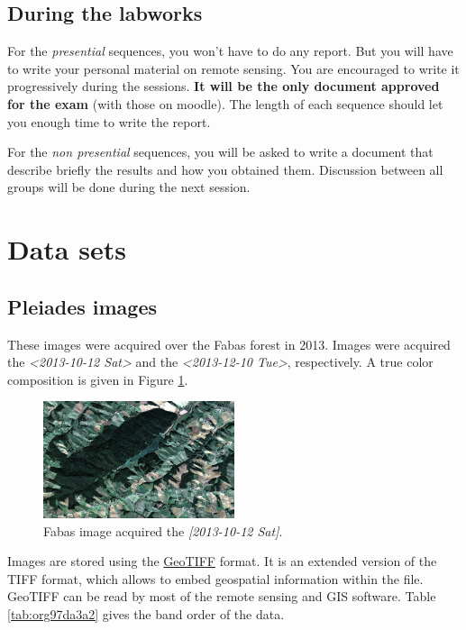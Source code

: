\documentclass[a4paper,11pt,DIV=18]{scrartcl}
\begin{document}
\subsection{During the labworks}
\label{sec:org47efc90}
For the \emph{presential} sequences, you won't have to do any report. But you
will have to  write your personal material on remote  sensing. You are
encouraged to write it progressively  during the sessions.  \textbf{It will be
the only  document approved for the  exam} (with those on  moodle). The
length  of each  sequence  should let  you enough  time  to write  the
report.

For  the \emph{non  presential}  sequences,  you will  be  asked  to write  a
document  that  describe briefly  the  results  and how  you  obtained
them.  Discussion between  all groups  will  be done  during the  next
session.
\section{Data sets}
\label{sec:orgcfb8282}
\subsection{Pleiades images}
\label{sec:org607d3bd}
These images were acquired over the  Fabas forest in 2013. Images were
acquired   the   \textit{<2013-10-12 Sat>    }    and   the   \textit{<2013-12-10 Tue>},
respectively. A true color composition is given in Figure \ref{fig:orgf503497}.

\begin{figure}[htbp]
\centering
\includegraphics[width=0.5\textwidth]{./figures/quicklook_fabas_12_10_2013.jpg}
\caption{\label{fig:orgf503497}
Fabas image acquired the \textit{[2013-10-12 Sat]}.}
\end{figure}

Images are stored using the \href{https://trac.osgeo.org/geotiff/}{GeoTIFF} format.  It is an extended version
of  the TIFF  format,  which allows  to  embed geospatial  information
within the file. GeoTIFF can be read by most of the remote sensing and
GIS software. Table \ref{tab:org97da3a2} gives the band order of the data.
\end{document}
